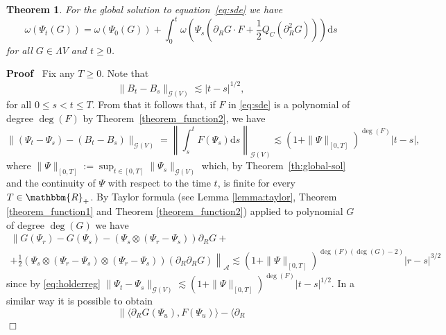 \documentclass[11pt]{article}
\newcommand{\assign}{:=}
\newcommand{\mathd}{\mathrm{d}}
\newcommand{\nobracket}{}
\newenvironment{proof}{\noindent\textbf{Proof\ }}{\hspace*{\fill}$\Box$\medskip}
\newtheorem{theorem}{Theorem}
\begin{document}
\begin{theorem}
  \label{th:ito}For the global solution to equation~{\eqref{eq:sde}} we have
  \begin{equation}
    \omega (\Psi_t (G)) = \omega (\Psi_0 (G)) + \int_0^t \omega \left( \Psi_s
    \left( \partial_R G \cdot F + \frac{1}{2} Q_C (\partial_R^2 G) \right)
    \right) \mathd s \label{eq:ito-3}
  \end{equation}
  for all $G \in \Lambda V$ and $t \geqslant 0$.
\end{theorem}

\begin{proof}
  Fix any $T \geqslant 0$. Note that
  \[ \| B_t - B_s \|_{\mathcal{G} (V)} \lesssim | t - s |^{1 / 2}, \]
  for all $0 \leqslant s < t \leqslant T$. From that it follows that, if $F$
  in {\eqref{eq:sde}} is a polynomial of degree $\deg (F)$ by
  Theorem~\ref{theorem_function2}, we have
  \begin{equation}
    \| (\Psi_t - \Psi_s) - (B_t - B_s) \|_{\mathcal{G} (V)} = \left\| \int_s^t
    F (\Psi_s) \mathd s \right\|_{\mathcal{G} (V)} \lesssim (1 + \| \Psi
    \|_{[0, T]})^{\deg (F)} | t - s |, \label{eq:holderreg}
  \end{equation}
  where $\| \Psi \|_{[0, T]} \assign \sup_{t \in [0, T]} \| \Psi_s
  \|_{\mathcal{G} (V)}$ which, by Theorem~\ref{th:global-sol} and the
  continuity of $\Psi$ with respect to the time $t$, is finite for every $T
  \in \mathbbm{R}_+$. By Taylor formula (see Lemma \ref{lemma:taylor}, Theorem
  \ref{theorem_function1} and Theorem \ref{theorem_function2}) applied to
  polynomial $G$ of degree $\deg (G)$ we have
  \begin{equation}
    \begin{array}{c}
      \nobracket \| G (\Psi_r) - G (\Psi_s) - (\Psi_s \otimes (\Psi_r -
      \Psi_s)) \partial_R G + \nobracket \nobracket\\
      \left. \left. + \frac{1}{2} (\Psi_s \otimes (\Psi_r - \Psi_s) \otimes
      (\Psi_r - \Psi_s)) (\partial_R \partial_R G) \right\|
      \right._{\mathcal{A}} \lesssim (1 + \| \Psi \|_{[0, T]})^{\deg (F) (\deg
      (G) - 2)} | r - s |^{3 / 2}
    \end{array} \label{eq:holderreg2}
  \end{equation}
  since by {\eqref{eq:holderreg}} $\| \Psi_t - \Psi_s \|_{\mathcal{G} (V)}
  \lesssim (1 + \| \Psi \|_{[0, T]})^{\deg (F)} | t - s |^{1 / 2}$. In a
  similar way it is possible to obtain
  \begin{equation}
    \| \langle \partial_R G (\Psi_u), F (\Psi_u) \rangle - \langle \partial_R

\end{equation}
\end{proof}
\end{document}
